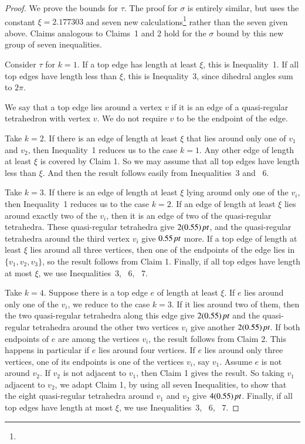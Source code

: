 \begin{proof}
We prove the bounds for $\tau$.  The proof for $\sigma$ is
entirely similar, but uses the constant $\xi=2.177303$ and seven
new calculations\footnote{} rather than the seven
given above. Claims analogous to Claims~1 and 2 hold for the
$\sigma$ bound by this new group of seven inequalities.


Consider $\tau$ for $k=1$.  If a top edge has length at least
$\xi$, this is Inequality~1.  If all top edges have length less
than $\xi$, this is Inequality~3, since dihedral angles sum to
$2\pi$.

We say that a top edge lies around a vertex $v$ if it is an edge
of a quasi-regular tetrahedron with vertex $v$. We do not require
$v$ to be the endpoint of the edge.

Take $k=2$. If there is an edge of length at least $\xi$ that lies
around only one of $v_1$ and $v_2$, then Inequality~1 reduces us
to the case $k=1$.  Any other edge of length at least $\xi$ is
covered by Claim 1.  So we may assume that all top edges have
length less than $\xi$.  And then the result follows easily from
Inequalities~3 and ~6.

Take $k=3$. If there is an edge of length at least $\xi$ lying
around only one of the $v_i$, then Inequality~1 reduces us to the
case $k=2$. If an edge of length at least $\xi$ lies around
exactly two of the $v_i$, then it is an edge of two of the
quasi-regular tetrahedra. These quasi-regular tetrahedra give
$2(0.55)\,\hbox{\it pt}$, and the quasi-regular tetrahedra around the third
vertex $v_i$ give $0.55\,\hbox{\it pt}$ more. If a top edge of length at
least $\xi$ lies around all three vertices, then one of the
endpoints of the edge lies in $\{v_1,v_2,v_3\}$, so the result
follows from Claim 1. Finally, if all top edges have length at
most $\xi$, we use Inequalities~3, ~6, ~7.

Take $k=4$.  Suppose there is a top edge $e$ of length at least
$\xi$. If $e$ lies around only one of the $v_i$, we reduce to the
case $k=3$. If it lies around two of them, then the two
quasi-regular tetrahedra along this edge give $2(0.55)\,\hbox{\it pt}$ and
the quasi-regular tetrahedra around the other two vertices $v_i$
give another $2(0.55)\,\hbox{\it pt}$.  If both endpoints of $e$ are among
the vertices $v_i$, the result follows from Claim 2.  This happens
in particular if $e$ lies around four vertices.  If $e$ lies
around only three vertices, one of its endpoints is one of the
vertices $v_i$, say $v_1$.  Assume $e$ is not around $v_2$. If
$v_2$ is not adjacent to $v_1$, then Claim 1 gives the result. So
taking $v_1$ adjacent to $v_2$, we adapt Claim 1, by using all
seven Inequalities, to show that the eight quasi-regular
tetrahedra around $v_1$ and $v_2$ give $4(0.55)\,\hbox{\it pt}$. Finally, if
all top edges have length at most $\xi$, we use Inequalities~3,
~6, ~7.
\end{proof}

